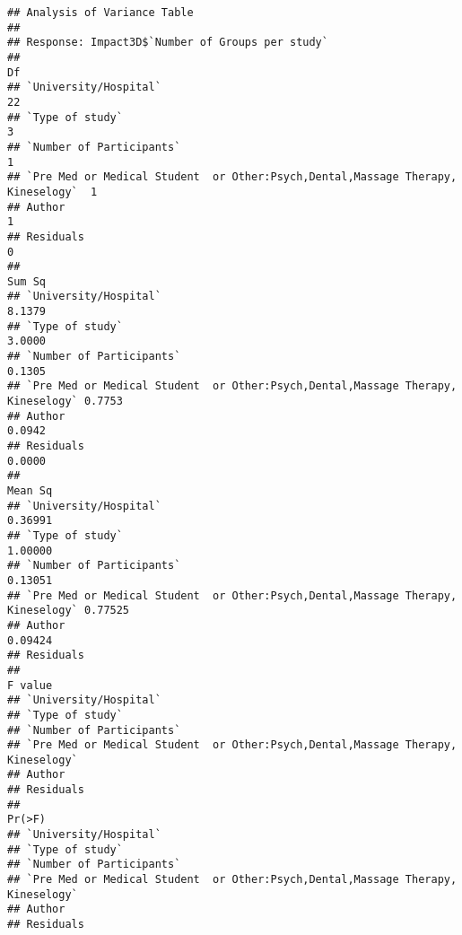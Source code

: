\documentclass[]{article}
\begin{document}
\begin{verbatim}
## Analysis of Variance Table
## 
## Response: Impact3D$`Number of Groups per study`
##                                                                                 Df
## `University/Hospital`                                                           22
## `Type of study`                                                                  3
## `Number of Participants`                                                         1
## `Pre Med or Medical Student  or Other:Psych,Dental,Massage Therapy, Kineselogy`  1
## Author                                                                           1
## Residuals                                                                        0
##                                                                                 Sum Sq
## `University/Hospital`                                                           8.1379
## `Type of study`                                                                 3.0000
## `Number of Participants`                                                        0.1305
## `Pre Med or Medical Student  or Other:Psych,Dental,Massage Therapy, Kineselogy` 0.7753
## Author                                                                          0.0942
## Residuals                                                                       0.0000
##                                                                                 Mean Sq
## `University/Hospital`                                                           0.36991
## `Type of study`                                                                 1.00000
## `Number of Participants`                                                        0.13051
## `Pre Med or Medical Student  or Other:Psych,Dental,Massage Therapy, Kineselogy` 0.77525
## Author                                                                          0.09424
## Residuals                                                                              
##                                                                                 F value
## `University/Hospital`                                                                  
## `Type of study`                                                                        
## `Number of Participants`                                                               
## `Pre Med or Medical Student  or Other:Psych,Dental,Massage Therapy, Kineselogy`        
## Author                                                                                 
## Residuals                                                                              
##                                                                                 Pr(>F)
## `University/Hospital`                                                                 
## `Type of study`                                                                       
## `Number of Participants`                                                              
## `Pre Med or Medical Student  or Other:Psych,Dental,Massage Therapy, Kineselogy`       
## Author                                                                                
## Residuals
\end{verbatim}
\end{document}
